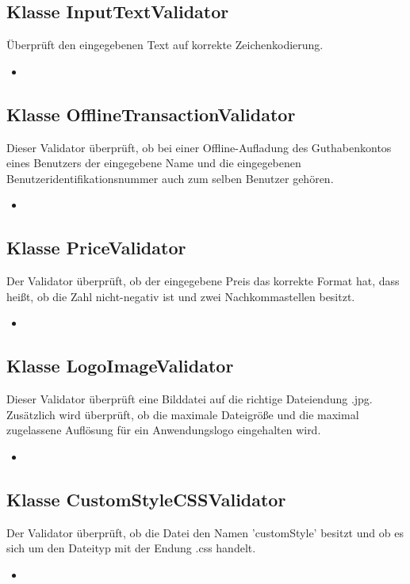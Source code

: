 	\subsection{Klasse InputTextValidator}
	Überprüft den eingegebenen Text auf korrekte Zeichenkodierung.
	\begin{itemize}
		\item \override
	\end{itemize}
	
	\subsection{Klasse OfflineTransactionValidator}
	Dieser Validator überprüft, ob bei einer Offline-Aufladung des Guthabenkontos eines Benutzers der eingegebene Name und die eingegebenen Benutzeridentifikationsnummer auch zum selben Benutzer gehören.
	\begin{itemize}
		\item \override
	\end{itemize}
	
	\subsection{Klasse PriceValidator}
	Der Validator überprüft, ob der eingegebene Preis das korrekte Format hat, dass heißt, ob die Zahl nicht-negativ ist und zwei Nachkommastellen besitzt.
	\begin{itemize}
		\item \override
	\end{itemize}
	
	\subsection{Klasse LogoImageValidator}
	Dieser Validator überprüft eine Bilddatei auf die richtige Dateiendung .jpg. Zusätzlich wird überprüft, ob
	die maximale Dateigröße und die maximal zugelassene Auflösung für ein Anwendungslogo eingehalten wird.
	\begin{itemize}
		\item \override
	\end{itemize}
	
	\subsection{Klasse CustomStyleCSSValidator}
	Der Validator überprüft, ob die Datei den Namen 'customStyle' besitzt und ob es sich um den Dateityp mit der Endung .css handelt.
	\begin{itemize}
		\item \override
	\end{itemize}
	

